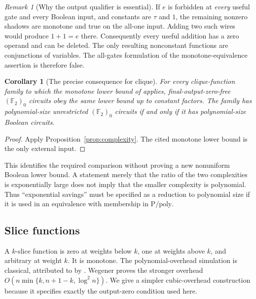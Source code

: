 \documentclass[11pt]{article}
\newcommand{\F}{\mathbb F}
\newtheorem{corollary}[theorem]{Corollary}
\theoremstyle{definition}
\theoremstyle{remark}
\newtheorem{remark}[theorem]{Remark}
\begin{document}
\begin{remark}[Why the output qualifier is essential]
If $e$ is forbidden at \emph{every} useful gate and every Boolean input, and constants are $\tau$ and $1$, the remaining nonzero shadows are monotone and true on the all-one input. Adding two such wires would produce $1+1=e$ there. Consequently every useful addition has a zero operand and can be deleted. The only resulting nonconstant functions are conjunctions of variables. The all-gates formulation of the monotone-equivalence assertion is therefore false.
\end{remark}

\begin{corollary}[The precise consequence for clique]\label{cor:clique}
For every clique-function family to which the monotone lower bound of \citet[Theorem~3.9, p.~12]{AB} applies, final-output-zero-free $(\F_2)_0$ circuits obey the same lower bound up to constant factors. The family has polynomial-size unrestricted $(\F_2)_0$ circuits if and only if it has polynomial-size Boolean circuits.
\end{corollary}
\begin{proof}
Apply Proposition~\ref{prop:complexity}. The cited monotone lower bound is the only external input.
\end{proof}
This identifies the required comparison without proving a new nonuniform Boolean lower bound. A statement merely that the ratio of the two complexities is exponentially large does not imply that the smaller complexity is polynomial. Thus ``exponential savings'' must be specified as a reduction to polynomial size if it is used in an equivalence with membership in $\mathrm P/\mathrm{poly}$.

\subsection{Slice functions}
A $k$-slice function is zero at weights below $k$, one at weights above $k$, and arbitrary at weight $k$. It is monotone. The polynomial-overhead simulation is classical, attributed to \citet{Berkowitz} by \citet[Theorem~2.6 and Remark~2.7, pp.~57--58]{WegenerSlice}. Wegener proves the stronger overhead $O(n\min\{k,n+1-k,\log^2n\})$. We give a simpler cubic-overhead construction because it specifies exactly the output-zero condition used here.
\end{document}
